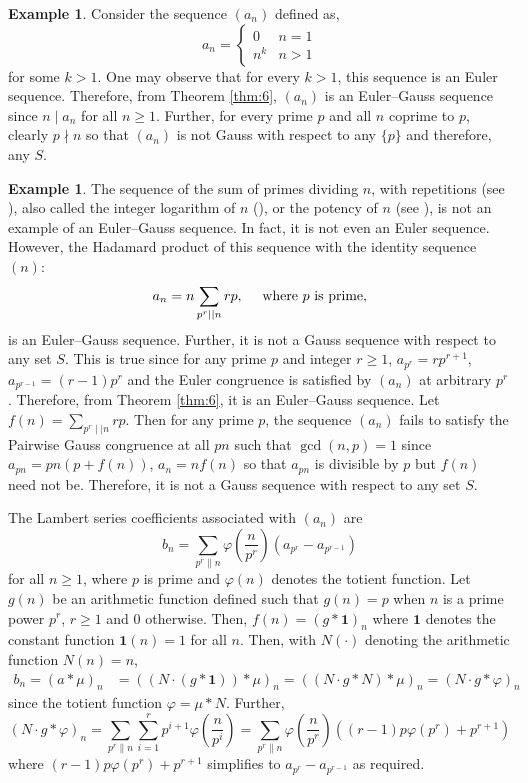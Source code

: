 \documentclass{article}
\numberwithin{equation}{section}
\theoremstyle{definition}
\newtheorem{example}[definition]{\bf {Example}}
\begin{document}
\begin{example}
    Consider the sequence $(a_n)$ defined as,  
    \[a_n=\begin{cases}
        0&n=1\\
        n^k&n>1
    \end{cases}\]
    for some $k>1$. One may observe that for every $k>1$, this sequence is an Euler sequence. Therefore, from Theorem \ref{thm:6}, $(a_n)$ is an Euler--Gauss sequence since $n\mid a_n$ for all $n\geq1$. Further, for every prime $p$ and all $n$ coprime to $p$, clearly $p\nmid n$ so that $(a_n)$ is not Gauss with respect to any $\{p\}$ and therefore, any $S$.
\end{example}
\begin{example}\label{ex:3}
    The sequence of the sum of primes dividing $n$, with repetitions (see \cite{alladiintegerlog}), also called the integer logarithm of $n$ (\cite[\textit{OEIS A001414}]{oeis}), or the potency of $n$ (see \cite{potencyofn}), is not an example of an Euler--Gauss sequence. In fact, it is not even an Euler sequence. However, the Hadamard product of this sequence with the identity sequence $(n)$:  
\[a_n=n\sum_{p^r\mid\mid n}rp,\quad \textnormal{ where } p \textnormal{ is prime}, \]
is an Euler--Gauss sequence. Further, it is not a Gauss sequence with respect to any set $S$. This is true since for any prime $p$ and integer $r\geq1$, $a_{p^r}=rp^{r+1}$, $a_{p^{r-1}}=(r-1)p^r$ and the Euler congruence is satisfied by $(a_n)$ at arbitrary $p^r$. Therefore, from Theorem \ref{thm:6}, it is an Euler--Gauss sequence. Let $f(n)=\sum_{p^r\mid\mid n}rp$. Then for any prime $p$, the sequence $(a_n)$ fails to satisfy the Pairwise Gauss congruence at all $pn$ such that $\gcd(n,p)=1$ since $a_{pn}=pn(p+f(n))$, $a_n=nf(n)$ so that $a_{pn}$ is divisible by $p$ but $f(n)$ need not be. Therefore, it is not a Gauss sequence with respect to any set $S$.

The Lambert series coefficients associated with $(a_n)$ are 
    \[b_n=\sum_{p^r\|n}\varphi\left(\frac{n}{p^r}\right)( a_{p^{r}}-a_{p^{r-1}}) \]
    for all $n\geq1$, where $p$ is prime and $\varphi(n)$ denotes the totient function. Let  $g(n)$ be an arithmetic function defined such that $g(n)=p$ when $n$ is a prime power $p^r$, $r\geq1$ and $0$ otherwise. Then, $f(n)=(g*\mathbf{1})_n$ where $\mathbf{1}$ denotes the constant function $\mathbf{1}(n)=1$ for all $n$. Then, with $N(\cdot)$ denoting the arithmetic function $N(n)=n$,  
\begin{align*}
    b_n=(a*\mu)_n&=((N\cdot(g*\mathbf{1}))*\mu)_n=((N\cdot g*N)*\mu)_n=(N\cdot g*\varphi)_n
\end{align*}
since the totient function $\varphi=\mu*N$. Further, 
\[(N\cdot g*\varphi)_n=\sum_{p^r\|n}\sum_{i=1}^rp^{i+1}\varphi\left(\frac{n}{p^i}\right)=\sum_{p^r\|n}\varphi\left(\frac{n}{p^r}\right)((r-1)p\varphi(p^r)+p^{r+1})\]
where $(r-1)p\varphi(p^r)+p^{r+1}$ simplifies to $a_{p^{r}}-a_{p^{r-1}}$ as required. 


\end{example}
\end{document}
